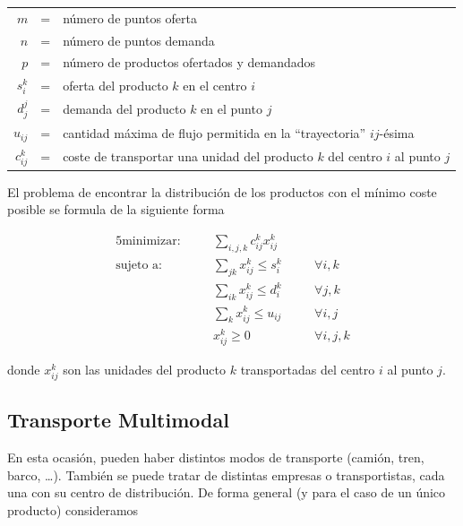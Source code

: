 \begin{center}
    \begin{tabular}{rcl}
        $m$         & = & número de puntos oferta \\
        $n$         & = & número de puntos demanda \\
        $p$         & = & número de productos ofertados y demandados \\
        $s_i^k$     & = & oferta del producto $k$ en el centro $i$ \\
        $d_j^j$     & = & demanda del producto $k$ en el punto $j$ \\
        $u_{ij}$    & = & cantidad máxima de flujo permitida en la ``trayectoria'' $ij$-ésima \\
        $c_{ij}^k$  & = & coste de transportar una unidad del producto $k$ del centro $i$ al punto $j$ \\
    \end{tabular}
\end{center}

El problema de encontrar la distribución de los productos con el mínimo coste posible se formula de la siguiente forma

\begin{alignat}{5}
    \text{minimizar:}   & \quad & \sum_{i,j,k}c_{ij}^kx_{ij}^k  & \quad &               \\
    \text{sujeto a:}    & \quad & \sum_{jk}x_{ij}^k\leq s_i^k   &       & \forall i,k   \\
                        & \quad & \sum_{ik}x_{ij}^k\leq d_i^k   &       & \forall j,k   \\
                        & \quad & \sum_kx_{ij}^k\leq u_{ij}     &       & \forall i,j   \\
                        & \quad & x_{ij}^k\geq 0                &       & \forall i,j,k           
\end{alignat}

donde $x_{ij}^k$ son las unidades del producto $k$ transportadas del centro $i$ al punto $j$.

\subsection{Transporte Multimodal}

En esta ocasión, pueden haber distintos modos de transporte (camión, tren, barco, \dots). También se puede tratar de 
distintas empresas o transportistas, cada una con su centro de distribución. De forma general (y para el caso de un único
producto) consideramos

